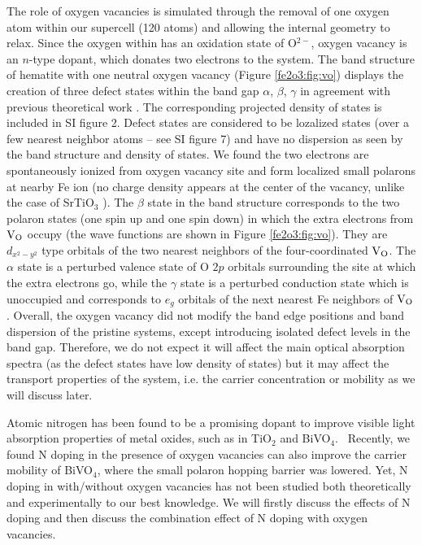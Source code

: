 The role of oxygen vacancies is simulated through the removal of one oxygen atom within our supercell (120 atoms) and allowing the internal geometry to relax. Since the oxygen within  has an oxidation state of O$^{2-}$, oxygen vacancy is an $n$-type dopant, which donates two electrons to the system. The band structure of hematite with one neutral oxygen vacancy (Figure \ref{fe2o3:fig:vo}) displays the creation of three defect states within the band gap $\alpha$, $\beta$, $\gamma$ in agreement with previous theoretical work \cite{lee2013thermodynamics}. The corresponding projected density of states is included in SI figure 2. Defect states are considered to be lozalized states (over a few nearest neighbor atoms -- see SI figure 7) and have no dispersion as seen by the band structure and density of states. We found the two electrons are spontaneously ionized from oxygen vacancy site and form localized small polarons at nearby Fe ion (no charge density appears at the center of the vacancy, unlike the case of SrTiO$_3$ \cite{janotti2014vacancies}). The $\beta$ state in the band structure corresponds to the two polaron states (one spin up and one spin down) in which the extra electrons from $\text{V}_\text{O}$ occupy (the wave functions are shown in Figure \ref{fe2o3:fig:vo}). They are $d_{x^2-y^2}$ type orbitals of the two nearest neighbors of the four-coordinated $\text{V}_\text{O}$. The $\alpha$ state is a perturbed valence state of O $2p$ orbitals surrounding the site at which the extra electrons go, while the $\gamma$ state is a perturbed conduction state which is unoccupied and corresponds to $e_g$ orbitals of the next nearest Fe neighbors of $\text{V}_\text{O}$. Overall, the oxygen vacancy did not modify the band edge positions and band dispersion of the pristine systems, except introducing isolated defect levels in the band gap. Therefore, we do not expect it will affect the main optical absorption spectra (as the defect states have low density of states) but it may affect the transport properties of the system, i.e. the carrier concentration or mobility as we will discuss later.



Atomic nitrogen has been found to be a promising dopant to improve visible light absorption properties of metal oxides, such as in TiO$_2$ \cite{ansari2016nitrogen} and BiVO$_4$.~\cite{kim2015simultaneous} Recently, we found N doping in the presence of oxygen vacancies can also improve the carrier mobility of BiVO$_4$, where the small polaron hopping barrier was lowered. Yet, N doping in  with/without oxygen vacancies has not been studied both theoretically and experimentally to our best knowledge. We will firstly discuss the effects of N doping and then discuss the combination effect of N doping with oxygen vacancies.

